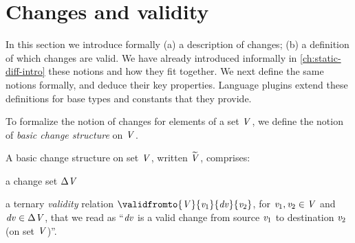 \section{Changes and validity}
\label{sec:changes-formally}
In this section we introduce formally (a) a description of changes; (b) a
definition of which changes are valid. We have already introduced informally in
\cref{ch:static-diff-intro} these notions and how they fit together. We next
define the same notions formally, and deduce their key properties.
Language plugins extend these definitions for base types and constants that they
provide.

To formalize the notion of changes for elements of a set \ensuremath{\Conid{V}}, we define the
notion of \emph{basic change structure} on \ensuremath{\Conid{V}}.

\begin{definition}
  \label{def:bchs}
  A basic change structure on set \ensuremath{\Conid{V}}, written \ensuremath{\widetilde{\Conid{V}}}, comprises:
  \begin{subdefinition}
  \item a change set \ensuremath{\Delta \Conid{V}}
  \item a ternary \emph{validity} relation \ensuremath{\validfromto{\Conid{V}}{\Varid{v}_{1}}{\Varid{dv}}{\Varid{v}_{2}}}, for \ensuremath{\Varid{v}_{1},\Varid{v}_{2}\in \Conid{V}} and \ensuremath{\Varid{dv}\in \Delta \Conid{V}}, that we read as ``\ensuremath{\Varid{dv}} is a valid change
    from source \ensuremath{\Varid{v}_{1}} to destination \ensuremath{\Varid{v}_{2}} (on set \ensuremath{\Conid{V}})''.
  \end{subdefinition}
\end{definition}


